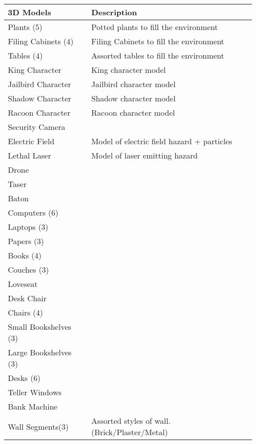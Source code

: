 \documentclass[11pt]{report}
\begin{document}
\begin{center}
    \begin{tabular}{| p{.45\linewidth} | p{.45\linewidth} |}
        \hline    
        3D Models   & Description  \\ \hline
        Plants (5)  &   Potted plants to fill the environment \\ \hline
        Filing Cabinets (4) &  Filing Cabinets to fill the environment \\ \hline
        Tables (4)  &  Assorted tables to fill the environment \\ \hline
        King Character  &  King character model \\ \hline
        Jailbird Character  &  Jailbird character model \\ \hline
        Shadow Character    &  Shadow character model \\ \hline
        Racoon Character    &  Racoon character model \\ \hline
        Security Camera &   \\ \hline
        Electric Field  &  Model of electric field hazard + particles \\ \hline
        Lethal Laser    &  Model of laser emitting hazard \\ \hline
        Drone   &  \\ \hline
        Taser   &  \\ \hline
        Baton   &  \\ \hline
        Computers (6)   &  \\ \hline
        Laptops (3) &  \\ \hline
        Papers (3)  &  \\ \hline
        Books (4)   &  \\ \hline
        Couches (3)  &  \\ \hline
        Loveseat    &  \\ \hline
        Desk Chair  &  \\ \hline
        Chairs (4)  &  \\ \hline
        Small Bookshelves (3)   &  \\ \hline
        Large Bookshelves (3)   &  \\ \hline
        Desks (6)   &  \\ \hline
        Teller Windows  &  \\ \hline
        Bank Machine    &  \\ \hline
        Wall Segments(3)    & Assorted styles of wall. (Brick/Plaster/Metal) \\
        \hline
    \end{tabular}
\end{center}
    
\end{document}
